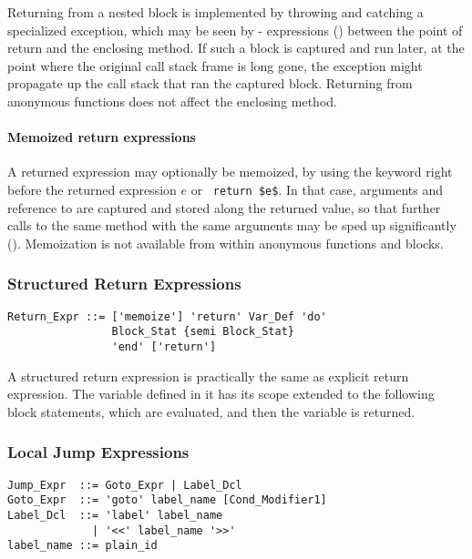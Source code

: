 Returning from a nested block is implemented by throwing and catching a specialized exception, which may be seen by - expressions () between the point of return and the enclosing method. If such a block is captured and run later, at the point where the original call stack frame is long gone, the exception might propagate up the call stack that ran the captured block. Returning from anonymous functions does not affect the enclosing method. 

\paragraph{Memoized return expressions}
A returned expression may optionally be memoized, by using the keyword  right before the returned expression $e$ or ~\lstinline!return $e$!. In that case, arguments and reference to  are captured and stored along the returned value, so that further calls to the same method with the same arguments may be sped up significantly (). Memoization is not available from within anonymous functions and blocks. 






\subsubsection{Structured Return Expressions}

\syntax\begin{lstlisting}
Return_Expr ::= ['memoize'] 'return' Var_Def 'do' 
                Block_Stat {semi Block_Stat} 
                'end' ['return']
\end{lstlisting}

A structured return expression is practically the same as explicit return expression. The variable defined in it has its scope extended to the following block statements, which are evaluated, and then the variable is returned. 






\subsubsection{Local Jump Expressions}
\label{sec:local-jump-expressions}

\syntax\begin{lstlisting}
Jump_Expr  ::= Goto_Expr | Label_Dcl
Goto_Expr  ::= 'goto' label_name [Cond_Modifier1]
Label_Dcl  ::= 'label' label_name 
             | '<<' label_name '>>'
label_name ::= plain_id
\end{lstlisting}

